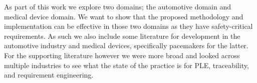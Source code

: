 As part of this work we explore two domains; the automotive domain and medical device domain. We want to show that the proposed methodology and implementation can be effective in those two domains as they have safety-critical requirements. As such we also include some literature for development in the automotive industry and medical devices, specifically pacemakers for the latter. For the supporting literature however we were more broad and looked across multiple industries to see what the state of the practice is for \ac{PLE}, traceability, and requirement engineering.





%






